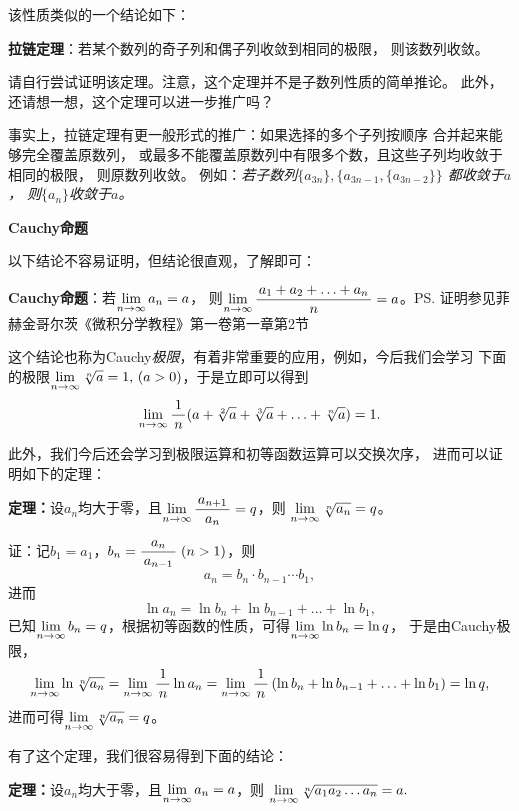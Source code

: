 该性质类似的一个结论如下：
\begin{thx}
	{\bf 拉链定理}：若某个数列的奇子列和偶子列收敛到相同的极限，
	则该数列收敛。
\end{thx}

请自行尝试证明该定理。注意，这个定理并不是子数列性质的简单推论。
此外，还请想一想，这个定理可以进一步推广吗？

事实上，拉链定理有更一般形式的推广：如果选择的多个子列按顺序
合并起来能够完全覆盖原数列，
或最多不能覆盖原数列中有限多个数，且这些子列均收敛于相同的极限，
则原数列收敛。
例如：{\it 若子数列$\{a_{3n}\},\{a_{3n-1},\{a_{3n-2}\}\}$
都收敛于$a$，
则$\{a_{n}\}$收敛于$a$。}

\begin{shaded}
{\bf Cauchy命题}

以下结论不容易证明，但结论很直观，了解即可：
\begin{tcolorbox}
	{\bf Cauchy命题}：若$\lim\limits_{n\to\infty} a_n=a$，
	则$\lim\limits_{n\to\infty}\displaystyle\frac{\,{a_1+a_2+\ldots+a_n}\,}{\,{n}\,}=a$。\ps{证明参见菲赫金哥尔茨《微积分学教程》第一卷第一章第2节}
\end{tcolorbox}

这个结论也称为Cauchy{\it 极限}，有着非常重要的应用，例如，今后我们会学习
下面的极限$\lim\limits_{n\to\infty}\sqrt[n]a=1,\,(a>0)$，于是立即可以得到
$$\lim\limits_{n\to\infty}\displaystyle\frac{\,{1}\,}{\,{n}\,}(a+\sqrt[2]a+\sqrt[3]a+\ldots+\sqrt[n]a)=1.$$

\bs
此外，我们今后还会学习到极限运算和初等函数运算可以交换次序，
进而可以证明如下的定理：

\begin{tcolorbox}
	{\bf 定理：}设$a_n$均大于零，且$\lim\limits_{n\to\infty}\displaystyle\frac{\,{a_{n+1}}\,}{\,{a_n}\,}=q$，则
	$\lim\limits_{n\to\infty}\sqrt[n]{a_n}=q$。	
\end{tcolorbox}

证：记$b_1=a_1$，$b_n=\displaystyle\frac{\,{a_n}\,}{\,{a_{n-1}}\,}\;(n>1)$，则
$$a_n=b_n\cdot b_{n-1}\cdots b_1,$$
进而
$$\ln a_n=\ln b_n+\ln b_{n-1}+\ldots+\ln b_1,$$
已知$\lim\limits_{n\to\infty} b_n=q$，根据初等函数的性质，可得$\lim\limits_{n\to\infty}\ln b_n=\ln q$，
于是由Cauchy极限，
$$\lim\limits_{n\to\infty}\ln \sqrt[n]{a_n}=\lim\limits_{n\to\infty}\displaystyle\frac{\,{1}\,}{\,{n}\,}\ln a_n=\lim\limits_{n\to\infty}\displaystyle\frac{\,{1}\,}{\,{n}\,}\left(
\ln b_n+\ln b_{n-1}+\ldots+\ln b_1\right)=\ln q,$$
进而可得$\lim\limits_{n\to\infty}\sqrt[n]{a_n}=q$。\fin 

\bs
有了这个定理，我们很容易得到下面的结论：
\begin{tcolorbox}
	{\bf 定理：}设$a_n$均大于零，且$\lim\limits_{n\to\infty} a_n=a$，则
	$\lim\limits_{n\to\infty}\sqrt[n]{a_1a_2\ldots a_n}=a.$
\end{tcolorbox}
\end{shaded}

